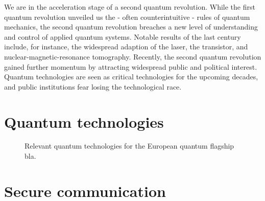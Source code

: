 We are in the acceleration stage of a second quantum revolution.
While the first quantum revolution unveiled us the - often counterintuitive - rules of quantum mechanics, the second quantum revolution breaches a new level of understanding and control of applied quantum systems.
Notable results of the last century include, for instance, the widespread adaption of the laser, the transistor, and nuclear-magnetic-resonance tomography.
Recently, the second quantum revolution gained further momentum by attracting widespread public and political interest.
Quantum technologies are seen as critical technologies for the upcoming decades, and public institutions fear losing the technological race.


\section{Quantum technologies}


\begin{figure}[htb]
	\centering
	
	\caption{Relevant quantum technologies for the European quantum flagship bla.}
\end{figure}



\section{Secure communication}


